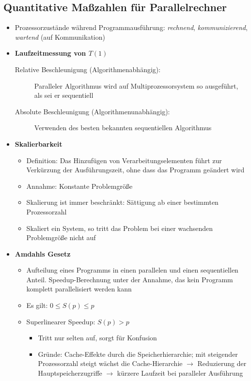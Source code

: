 \subsection{Quantitative Maßzahlen für Parallelrechner}
\begin{itemize}
	\item Prozessorzustände während Programmausführung: \textit{rechnend}, \textit{kommunizierend}, \textit{wartend} (auf Kommunikation)
	\item \textbf{Laufzeitmessung von \(T(1)\)}
	\begin{description}
		\item[Relative Beschleunigung (Algorithmenabhängig):] Paralleler Algorithmus wird auf Multiprozessorsystem so ausgeführt, als sei er sequentiell
		\item[Absolute Beschleunigung (Algorithmenunabhängig):] Verwenden des besten bekannten sequentiellen Algorithmus
	\end{description}
	\item \textbf{Skalierbarkeit}
	\begin{itemize}
		\item Definition: Das Hinzufügen von Verarbeitungselementen führt zur Verkürzung der Ausführungszeit, ohne dass das Programm geändert wird
		\item Annahme: Konstante Problemgröße
		\item Skalierung ist immer beschränkt: Sättigung ab einer bestimmten Prozessorzahl
		\item Skaliert ein System, so tritt das Problem bei einer wachsenden Problemgröße nicht auf
	\end{itemize}
	\item \textbf{Amdahls Gesetz}
	\begin{itemize}
		\item Aufteilung eines Programms in einen parallelen und einen sequentiellen Anteil. Speedup-Berechnung unter der Annahme, das kein Programm komplett parallelisiert werden kann
		\item Es gilt: \(0 \le S(p) \le p\)
		\item Superlinearer Speedup: \(S(p) > p\)
		\begin{itemize}
			\item Tritt nur selten auf, sorgt für Konfusion
			\item Gründe: Cache-Effekte durch die Speicherhierarchie; mit steigender Prozessorzahl steigt wächst die Cache-Hierarchie \(\rightarrow\) Reduzierung der Hauptspeicherzugriffe \(\rightarrow\) kürzere Laufzeit bei paralleler Ausführung
		\end{itemize}
	\end{itemize}
\end{itemize}


